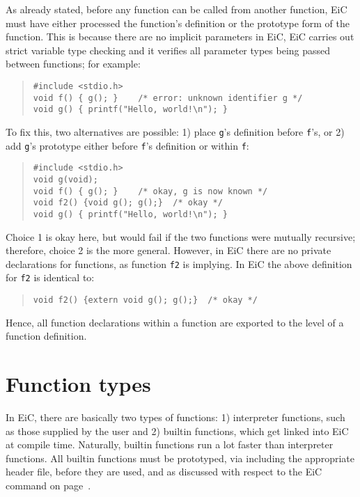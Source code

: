 As already stated, before any function can be called from another
function, EiC must have either processed the function's definition or
the prototype form of the function. This is because there are no
implicit parameters in EiC,
EiC carries out strict variable type checking and it verifies all
parameter types being passed between functions; for example:

\begin{quote}
\begin{verbatim}
#include <stdio.h>
void f() { g(); }    /* error: unknown identifier g */
void g() { printf("Hello, world!\n"); }
\end{verbatim}
\end{quote}

To fix this, two alternatives are possible: 1) place {\tt g}'s
definition before {\tt f}'s, or 2) add {\tt g}'s prototype either
before {\tt f}'s definition or within {\tt f}:
\begin{quote}
\begin{verbatim}
#include <stdio.h>
void g(void);   
void f() { g(); }    /* okay, g is now known */
void f2() {void g(); g();}  /* okay */ 
void g() { printf("Hello, world!\n"); }
\end{verbatim}
\end{quote}

Choice 1 is okay here, but would fail if the two functions were
mutually recursive; therefore, choice 2 is the more general. However,
in EiC there are no private declarations for functions, as function
{\tt f2} is implying. In EiC the above definition for {\tt f2} is
identical to:

\begin{quote}
\begin{verbatim}
void f2() {extern void g(); g();}  /* okay */
\end{verbatim}
\end{quote}

Hence, all function declarations within a function are exported to
the level of a function definition. 

\section{Function types}
\label{sec:FunctionTypes}

In EiC, there are basically two types of functions: 1) interpreter
functions, such as those supplied by the
user and 2) builtin functions, which get linked
into EiC at compile time.  Naturally, builtin functions run a lot
faster than interpreter functions.  All builtin functions must be
prototyped, via including the appropriate header file, before they are
used, and as discussed with respect to the EiC  command on
page~\pageref{item:show}.

